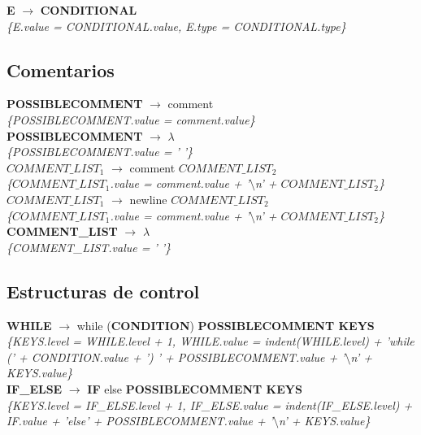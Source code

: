 \documentclass[10pt,a4paper]{article}
\begin{document}
\textbf{E} $\rightarrow$ \textbf{CONDITIONAL} \\
\textit{\{E.value = CONDITIONAL.value, E.type = CONDITIONAL.type\}} \\

\subsection{Comentarios}

\textbf{POSSIBLECOMMENT} $\rightarrow$ comment \\
\textit{\{POSSIBLECOMMENT.value = comment.value\}} \\

\textbf{POSSIBLECOMMENT} $\rightarrow$ $\lambda$ \\
\textit{\{POSSIBLECOMMENT.value = ' '\}} \\

\textbf{$COMMENT\_LIST_{1}$} $\rightarrow$ comment \textbf{$COMMENT\_LIST_{2}$} \\
\textit{\{$COMMENT\_LIST_{1}$.value = comment.value + '$\setminus$n' + $COMMENT\_LIST_{2}$\}} \\

\textbf{$COMMENT\_LIST_{1}$} $\rightarrow$ newline \textbf{$COMMENT\_LIST_{2}$} \\
\textit{\{$COMMENT\_LIST_{1}$.value = comment.value + '$\setminus$n' + $COMMENT\_LIST_{2}$\}} \\

\textbf{COMMENT\_LIST} $\rightarrow$ $\lambda$ \\
\textit{\{COMMENT\_LIST.value = ' '\}} \\

\subsection{Estructuras de control}
\textbf{WHILE} $\rightarrow$ while (\textbf{CONDITION}) \textbf{POSSIBLECOMMENT KEYS} \\
\textit{\{KEYS.level = WHILE.level + 1, WHILE.value = indent(WHILE.level) + 'while (' + CONDITION.value + ') ' + POSSIBLECOMMENT.value + '$\setminus$n' + KEYS.value\}} \\

\textbf{IF\_ELSE} $\rightarrow$ \textbf{IF} else \textbf{POSSIBLECOMMENT KEYS} \\
\textit{\{KEYS.level = IF\_ELSE.level + 1, IF\_ELSE.value = indent(IF\_ELSE.level) + IF.value + 'else' + POSSIBLECOMMENT.value + '$\setminus$n' + KEYS.value\}} \\
\end{document}
